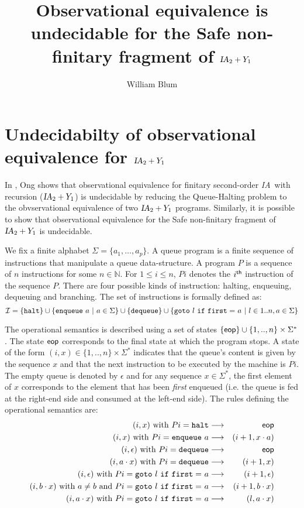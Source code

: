 \documentclass{article}
\author{William Blum}
\title{Observational equivalence is undecidable for the Safe non-finitary fragment of $\ialgol_2 + Y_1$}
\newcommand\nat{\mathbb{N}}
\newcommand\eop{{\sf eop}}
\newcommand\ialgol{{\textsl{IA}}}
\begin{document}
\maketitle

\section{Undecidabilty of observational equivalence for $\ialgol_2 + Y_1$}

In \cite{Ong02}, Ong shows that observational equivalence for finitary second-order \ialgol\ with recursion ($\ialgol_2 + Y_1$) is undecidable by reducing the Queue-Halting problem to the obvservational equivalence of two $\ialgol_2 + Y_1$ programs. Similarly, it is possible to show that observational equivalence for the Safe non-finitary fragment of $\ialgol_2 + Y_1$ is undecidable.


We fix a finite alphabet $\Sigma = \{ a_1, \ldots, a_p \}$. A queue program is a finite sequence of instructions that manipulate a queue data-structure. 
A program $P$ is a sequence of $n$ instructions for some $n\in \nat$. For $1 \leq i \leq n$, $P i$ denotes the $i^{\sf th}$ instruction of the sequence $P$. There are four possible kinds of instruction: halting, enqueuing, dequeuing and branching. The set of instructions is formally defined as:
$$ \mathcal{I} = \{ {\tt halt} \} \cup
\{ {\tt enqueue \ } a \ | \ a \in \Sigma \}
\cup \{ {\tt dequeue} \} \cup \{ {\tt goto\ } l {\tt\ if\ first =\ } a \ | \ l \in 1..n, a \in \Sigma \}
 $$


The operational semantics is described using a set of states $ \{ \eop \} \cup \{ 1,..,n \} \times \Sigma^* $. The state $\eop$ corresponds to the final state at which the program stops. A state of the form $(i,x) \in \{ 1,..,n \} \times \Sigma^*$ indicates that the queue's content is given by the sequence $x$ and that the next instruction to be executed by the machine is $P i$. The empty queue is denoted by $\epsilon$ and for any sequence $x \in \Sigma^*$, the first element of $x$ corresponds to the element that has been \emph{first} enqueued (i.e. the queue is fed at the right-end side and consumed at the left-end side). The rules defining the operational semantics are:
\begin{eqnarray*}
(i,x) \mbox{ with } P i = {\tt halt} &\longrightarrow& \eop \\
(i,x) \mbox{ with } P i = {\tt enqueue\ } a &\longrightarrow& (i+1,x \cdot a) \\
(i,\epsilon) \mbox{ with } P i = {\tt dequeue } &\longrightarrow& \eop \\
(i,a \cdot x) \mbox{ with } P i = {\tt dequeue } &\longrightarrow& (i+1,x) \\
(i,\epsilon) \mbox{ with } P i =  {\tt goto\ } l {\tt\ if\ first =\ } a &\longrightarrow& (i+1,\epsilon) \\
(i,b \cdot x) \mbox{ with } a \neq b \mbox{ and } P i =  {\tt goto\ } l {\tt\ if\ first =\ } a &\longrightarrow& (i+1,b \cdot x) \\
(i,a \cdot x) \mbox{ with } P i =  {\tt goto\ } l {\tt\ if\ first =\ } a &\longrightarrow& (l,a \cdot x)
\end{eqnarray*}
\end{document}
